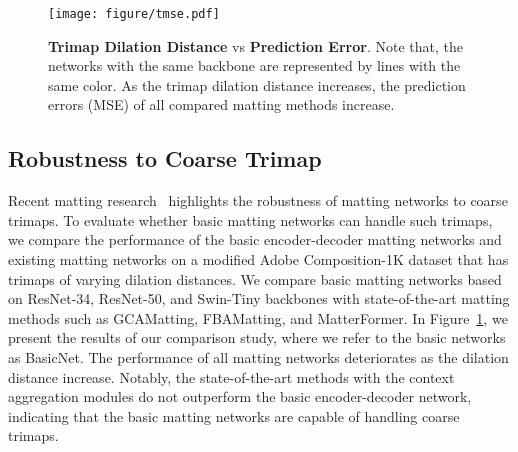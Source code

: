 \documentclass[10pt,twocolumn,letterpaper]{article}
\begin{document}
\begin{figure}[!t]
    \texttt{[image: figure/tmse.pdf]}
    \vspace{-0.1cm}
    \caption{  \textbf{Trimap Dilation Distance} vs \textbf{Prediction Error}. Note that, the networks with the same backbone are represented by lines with the same color.  As the trimap dilation distance increases, the prediction errors (MSE) of all compared matting methods increase. }
        \vspace{-0.3cm}
    \label{fig:pvse2}
\end{figure}

\subsection{Robustness to Coarse Trimap}
Recent matting research~\cite{yu2020mask,dai2022boosting} highlights the robustness of matting networks to coarse trimaps.
To evaluate whether basic matting networks can handle such trimaps, we compare the performance of the basic encoder-decoder matting networks and existing matting networks on a modified Adobe Composition-1K dataset that has trimaps of varying dilation distances. 
We compare basic matting networks based on ResNet-34, ResNet-50, and Swin-Tiny backbones with state-of-the-art matting methods such as GCAMatting, FBAMatting, and MatterFormer.
In Figure~\ref{fig:pvse2}, we present the results of our comparison study, where we refer to the basic networks as BasicNet. 
The performance of all matting networks deteriorates as the dilation distance increase.
Notably, the state-of-the-art methods with the context aggregation modules do not outperform the basic encoder-decoder network, indicating that the basic matting networks are capable of handling coarse trimaps.
\end{document}
